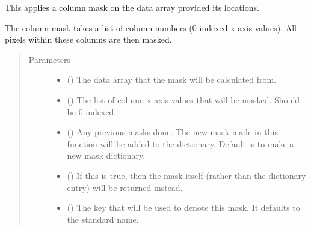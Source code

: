 \documentclass[letterpaper,10pt,english]{sphinxmanual}
\begin{document}
\begin{fulllineitems}
\label{\detokenize{python_docstrings/IfA_Smeargle.echo.masks.masks_echo300:IfA_Smeargle.echo.masks.masks_echo300.echo382_column_mask}}
This applies a column mask on the data array provided its locations.

The column mask takes a list of column numbers (0-indexed x-axis
values). All pixels within these columns are then masked.
\begin{quote}\begin{description}
\item[{Parameters}] \leavevmode\begin{itemize}
\item {} 
 () \textendash{} The data array that the mask will be calculated from.

\item {} 
 () \textendash{} The list of column x-axis values that will be masked. Should be
0-indexed.

\item {} 
 (\sphinxstyleliteralemphasis{\sphinxupquote{ (}}\sphinxstyleliteralemphasis{\sphinxupquote{)}}) \textendash{} Any previous masks done. The new mask made in this function will be
added to the dictionary. Default is to make a new mask dictionary.

\item {} 
 (\sphinxstyleliteralemphasis{\sphinxupquote{ (}}\sphinxstyleliteralemphasis{\sphinxupquote{)}}) \textendash{} If this is true, then the mask itself (rather than the dictionary
entry) will be returned instead.

\item {} 
 (\sphinxstyleliteralemphasis{\sphinxupquote{ (}}\sphinxstyleliteralemphasis{\sphinxupquote{)}}) \textendash{} The key that will be used to denote this mask. It defaults to the
standard name.


\end{itemize}
\end{description}
\end{quote}
\end{fulllineitems}
\end{document}
